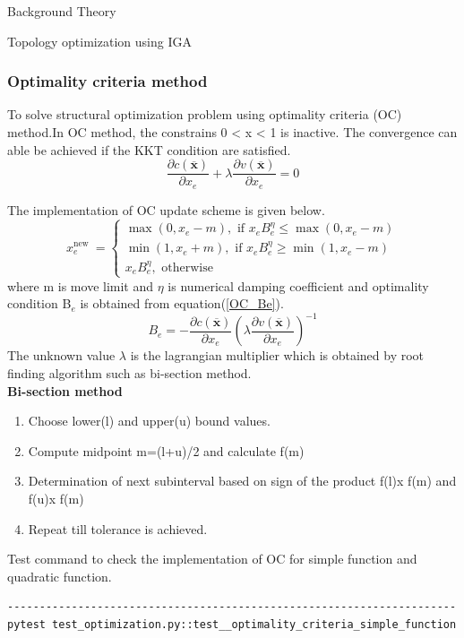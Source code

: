 \documentclass[a4paper,12pt,times]{article}
\begin{document}
\begin{section}{Background Theory}
\begin{subsection}{Topology optimization using IGA}
\subsubsection{Optimality criteria method}
To solve structural optimization problem using optimality criteria (OC) method.In OC method, the constrains  0 < x < 1 is inactive. The convergence can able be achieved if the KKT condition are satisfied. 
\begin{equation}
\frac{\partial c(\overline{\mathbf{x}})}{\partial x_{e}}+\lambda \frac{\partial v(\overline{\mathbf{x}})}{\partial x_{e}}=0
\end{equation}

The implementation of OC update scheme is given below.
\begin{equation}
x_{e}^{\text {new }}=\left\{\begin{array}{l}
\max \left(0, x_{e}-m\right), \text { if } x_{e} B_{e}^{\eta} \leq \max \left(0, x_{e}-m\right) \\
\min \left(1, x_{e}+m\right), \text { if } x_{e} B_{e}^{\eta} \geq \min \left(1, x_{e}-m\right) \\
x_{e} B_{e}^{\eta}, \text { otherwise }
\end{array}\right.
\end{equation}
where m is move limit and $\eta$ is numerical damping coefficient and optimality condition B$_e$ is obtained from equation(\ref{OC_Be}).
\begin{equation}\label{OC_Be}
B_{e}=-\frac{\partial c(\overline{\mathbf{x}})}{\partial x_{e}}\left(\lambda \frac{\partial v(\overline{\mathbf{x}})}{\partial x_{e}}\right)^{-1}
\end{equation}
The unknown value $\lambda$ is the lagrangian multiplier which is obtained by root finding algorithm such as bi-section method.\\

\textbf{Bi-section method}
\begin{enumerate}
\item Choose lower(l) and upper(u) bound values.
\item Compute midpoint m=(l+u)/2 and calculate f(m)
\item Determination of next subinterval based on sign of the product f(l)x f(m) and f(u)x f(m)
\item Repeat till tolerance is achieved.
\end{enumerate}

Test command to check the implementation of OC for simple function and quadratic function.
\begin{verbatim}
----------------------------------------------------------------------
pytest test_optimization.py::test__optimality_criteria_simple_function


\end{verbatim}
\end{subsection}
\end{section}
\end{document}
